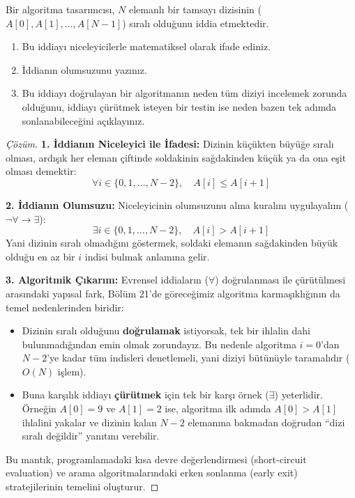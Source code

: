 \begin{example}
Bir algoritma tasarımcısı, $N$ elemanlı bir tamsayı dizisinin ($A[0], A[1], \dots, A[N-1]$) sıralı olduğunu iddia etmektedir. 
\begin{enumerate}
  \item Bu iddiayı niceleyicilerle matematiksel olarak ifade ediniz.
  \item İddianın olumsuzunu yazınız.
  \item Bu iddiayı doğrulayan bir algoritmanın neden tüm diziyi incelemek zorunda olduğunu, iddiayı çürütmek isteyen bir testin ise neden bazen tek adımda sonlanabileceğini açıklayınız.
\end{enumerate}
\end{example}
\begin{proof}[Çözüm]
\textbf{1. İddianın Niceleyici ile İfadesi:}
Dizinin küçükten büyüğe sıralı olması, ardışık her eleman çiftinde soldakinin sağdakinden küçük ya da ona eşit olması demektir:
\[ \forall i \in \{0, 1, \dots, N-2\}, \quad A[i] \le A[i+1] \]

\textbf{2. İddianın Olumsuzu:}
Niceleyicinin olumsuzunu alma kuralını uygulayalım ($\neg \forall \to \exists$):
\[ \exists i \in \{0, 1, \dots, N-2\}, \quad A[i] > A[i+1] \]
Yani dizinin sıralı olmadığını göstermek, soldaki elemanın sağdakinden büyük olduğu en az bir $i$ indisi bulmak anlamına gelir.

\textbf{3. Algoritmik Çıkarım:}
Evrensel iddiaların ($\forall$) doğrulanması ile çürütülmesi arasındaki yapısal fark, Bölüm 21'de göreceğimiz algoritma karmaşıklığının da temel nedenlerinden biridir:
\begin{itemize}
  \item Dizinin sıralı olduğunu \textbf{doğrulamak} istiyorsak, tek bir ihlalin dahi bulunmadığından emin olmak zorundayız. Bu nedenle algoritma $i = 0$'dan $N-2$'ye kadar tüm indisleri denetlemeli, yani diziyi bütünüyle taramalıdır ($O(N)$ işlem).
  \item Buna karşılık iddiayı \textbf{çürütmek} için tek bir karşı örnek ($\exists$) yeterlidir. Örneğin $A[0] = 9$ ve $A[1] = 2$ ise, algoritma ilk adımda $A[0] > A[1]$ ihlalini yakalar ve dizinin kalan $N-2$ elemanına bakmadan doğrudan ``dizi sıralı değildir'' yanıtını verebilir.
\end{itemize}
Bu mantık, programlamadaki kısa devre değerlendirmesi (short-circuit evaluation) ve arama algoritmalarındaki erken sonlanma (early exit) stratejilerinin temelini oluşturur.
\end{proof}
